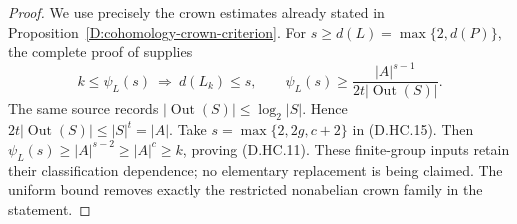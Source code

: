 \begin{proof}
We use precisely the crown estimates already stated in
Proposition~\ref{D:cohomology-crown-criterion}. For
$s\geq d(L)=\max\{2,d(P)\}$, the complete proof of
\citet[Proposition 2.6, equations (2.1)--(2.2), pp.~12--13]
{LucchiniMarionTracey2020D} supplies
\[
 k\leq\psi_L(s)\ \Longrightarrow\ d(L_k)\leq s,
 \qquad
 \psi_L(s)\geq\frac{|A|^{s-1}}{2t|\operatorname{Out}(S)|}.
                                                               \tag{D.HC.15}
\]
The same source records
$|\operatorname{Out}(S)|\leq\log_2|S|$. Hence
$2t|\operatorname{Out}(S)|\leq|S|^t=|A|$.
Take $s=\max\{2,2g,c+2\}$ in (D.HC.15). Then
$\psi_L(s)\geq|A|^{s-2}\geq|A|^c\geq k$, proving
(D.HC.11). These finite-group inputs retain their
classification dependence; no elementary replacement is
being claimed. The uniform bound removes exactly the
restricted nonabelian crown family in the statement.
\end{proof}
